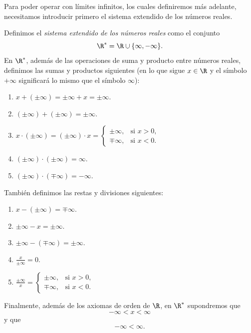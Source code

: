 \documentclass[12pt,a4paper]{book}
\begin{document}
    Para poder operar con límites infinitos, los cuales definiremos más adelante,
    necesitamos introducir primero el sistema extendido de los números
    reales.

    \begin{definicion}\label{def:32}
        Definimos
        el \textit{sistema extendido de los números reales} como el conjunto
        \begin{equation*}
            \R^{*}=\R\cup\{\infty,-\infty\}.
        \end{equation*}
        En $\R^{*}$, además de las operaciones de suma y producto entre números reales,
        definimos las sumas y productos siguientes (en lo que sigue $x\in\R$ y el símbolo
        $+\infty$ significará lo mismo que el símbolo $\infty$):
        \begin{enumerate}[label=\arabic*.,nosep]
            \item $x+(\pm\infty)=\pm\infty+x=\pm\infty$.
            \item $(\pm\infty)+(\pm\infty)=\pm\infty$.
            \item $x\cdot(\pm\infty)=(\pm\infty)\cdot x=\begin{cases}\pm\infty, & \text{si }x>0,\\ \mp\infty, & \text{si }x<0.\end{cases}$
            \item $(\pm\infty)\cdot(\pm\infty)=\infty$.
            \item $(\pm\infty)\cdot(\mp\infty)=-\infty$.
        \end{enumerate}
        También definimos las restas y divisiones siguientes:
        \begin{enumerate}[label=\arabic*.,nosep,resume]
            \item $x-(\pm\infty)=\mp\infty$.
            \item $\pm\infty-x=\pm\infty$.
            \item $\pm\infty-(\mp\infty)=\pm\infty$.
            \item $\frac{x}{\pm\infty}=0$.
            \item $\frac{\pm\infty}{x}=\begin{cases}\pm\infty, & \text{si }x>0,\\ \mp\infty, & \text{si }x<0.\end{cases}$
        \end{enumerate}
        Finalmente, además de los axiomas de orden de $\R$, en $\R^{*}$ supondremos que
        \begin{equation*}
            -\infty<x<\infty
        \end{equation*}
        y que
        \begin{equation*}
            -\infty<\infty.
        \end{equation*}
    \end{definicion}
\end{document}
